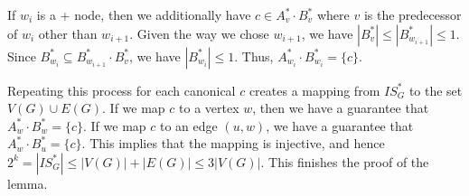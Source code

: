 If $w_i$ is a + node, then we additionally have $c \in A_v^* \cdot B_v^*$ where $v$ is the predecessor of $w_i$ other than $w_{i+1}$. Given the way we chose $w_{i+1}$, we have $|B_v^*| \leq |B_{w_{i+1}}^*| \leq 1$. Since $B_{w_i}^* \subseteq B_{w_{i+1}}^* \cdot B_v^*$, we have $|B_{w_i}^*| \leq 1$. Thus, $A_{w_i}^* \cdot B_{w_i}^* = \{c\}$.

Repeating this process for each canonical $c$ creates a mapping from $IS^*_G$ to the set $V(G) \cup E(G)$. If we map $c$ to a vertex $w$, then we have a guarantee that $A_w^* \cdot B_w^* = \{c\}$. If we map $c$ to an edge $(u,w)$, we have a guarantee that $A_w^* \cdot B_u^* = \{c\}$. This implies that the mapping is injective, and hence $2^k = |IS^*_G| \leq |V(G)| + |E(G)| \leq 3|V(G)|$. This finishes the proof of the lemma.


